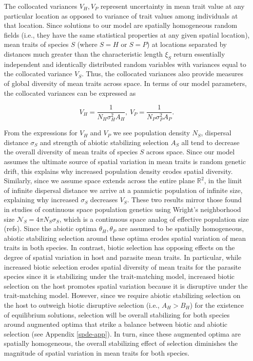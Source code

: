 \documentclass{article}
\begin{document}
The collocated variances \(V_H,V_P\) represent uncertainty in mean trait
value at any particular location as opposed to variance of trait values
among individuals at that location. Since solutions to our model are
spatially homogeneous random fields (i.e., they have the same
statistical properties at any given spatial location), mean traits of
species \(S\) (where \(S=H\) or \(S=P\)) at locations separated by
distances much greater than the characteristic length \(\xi_S\) return
essentially independent and identically distributed random variables
with variances equal to the collocated variance \(V_S\). Thus, the
collocated variances also provide measures of global diversity of mean
traits across space. In terms of our model parameters, the collocated
variances can be expressed as

\begin{equation}\label{coll-vars}
  V_H = \frac{1}{ N_H\sigma_H^2A_H}, \ V_P = \frac{1}{ N_P\sigma_P^2A_P}.
\end{equation}

From the expressions for \(V_H\) and \(V_P\) we see population density
\(N_S\), dispersal distance \(\sigma_S\) and strength of abiotic
stabilizing selection \(A_S\) all tend to decrease the overall diversity
of mean traits of species \(S\) across space. Since our model assumes
the ultimate source of spatial variation in mean traits is random
genetic drift, this explains why increased population density erodes
spatial diversity. Similarly, since we assume space extends across the
entire plane \(\mathbb R^2\), in the limit of infinite dispersal
distance we arrive at a panmictic population of infinite size,
explaining why increased \(\sigma_S\) decreases \(V_S\). These two
results mirror those found in studies of continuous space population
genetics using Wright's neighborhood size
\(\mathscr N_S=4\pi N_S\sigma_S\), which is a continuous space analog of
effective population size (refs). Since the abiotic optima
\(\theta_H,\theta_P\) are assumed to be spatially homogeneous, abiotic
stabilizing selection around these optima erodes spatial variation of
mean traits in both species. In contrast, biotic selection has opposing
effects on the degree of spatial variation in host and parasite mean
traits. In particular, while increased biotic selection erodes spatial
diversity of mean traits for the parasite species since it is
stabilizing under the trait-matching model, increased biotic selection
on the host promotes spatial variation because it is disruptive under
the trait-matching model. However, since we require abiotic stabilizing
selection on the host to outweigh biotic disruptive selection (i.e.,
\(A_H>B_H\)) for the existence of equilibrium solutions, selection will
be overall stabilizing for both species around augmented optima that
strike a balance between biotic and abiotic selection (see Appendix
\ref{spde-app}). In turn, since these augmented optima are spatially
homogeneous, the overall stabilizing effect of selection diminishes the
magnitude of spatial variation in mean traits for both species.
\end{document}
